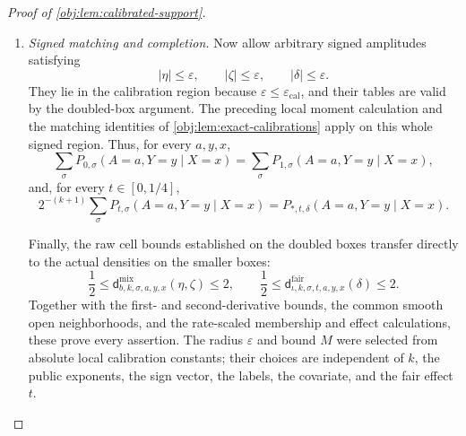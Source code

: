 \documentclass[11pt]{article}
\begin{document}
\begin{proof}[Proof of \cref{obj:lem:calibrated-support}]
\begin{enumerate}
For the fair family,
\cref{obj:lem:exact-calibrations} gives
\[
E_{\mathbf s}\mathsf G\!\left(
 t,\mathfrak p(t,\delta,u)+\delta Z_u\right)
=\mathsf G\!\left(\mathsf T(t,\delta),
                       \mathfrak p(t,\delta,u)\right).
\]
The control-risk average is \(\mathfrak p(t,\delta,u)\), by
\(E_{\mathbf s}Z_u=0\). Since treatment is fair, the four averaged cells are therefore
\[
\begin{aligned}
E_{\mathbf s}\pi^{\mathrm{fair}}_{\mathrm r,\mathbf s,01}
&=\frac12\mathfrak p(t,\delta,u),&
E_{\mathbf s}\pi^{\mathrm{fair}}_{\mathrm r,\mathbf s,00}
&=\frac12\{1-\mathfrak p(t,\delta,u)\},\\
E_{\mathbf s}\pi^{\mathrm{fair}}_{\mathrm r,\mathbf s,11}
&=\frac12\mathsf G(\mathsf T(t,\delta),\mathfrak p(t,\delta,u)),&
E_{\mathbf s}\pi^{\mathrm{fair}}_{\mathrm r,\mathbf s,10}
&=\frac12\{1-\mathsf G(\mathsf T(t,\delta),\mathfrak p(t,\delta,u))\}.
\end{aligned}
\]
These are exactly the comparator cells. Counting sign extensions and using validity proves the required full uniform-average identity. The calibration identities invoked here apply also at \(t=0\), at zero amplitudes, and at \(u=0,1\).

\item \textit{Signed matching and completion.}
Now allow arbitrary signed amplitudes satisfying
\[
|\eta|\le\varepsilon,\qquad
|\zeta|\le\varepsilon,\qquad
|\delta|\le\varepsilon.
\]
They lie in the calibration region because
\(\varepsilon\le\varepsilon_{\mathrm{cal}}\), and their tables are valid by the doubled-box argument. The preceding local moment calculation and the matching identities of
\cref{obj:lem:exact-calibrations} apply on this whole signed region. Thus, for every \(a,y,x\),
\[
\sum_\sigma P_{0,\sigma}(A=a,Y=y\mid X=x)
=\sum_\sigma P_{1,\sigma}(A=a,Y=y\mid X=x),
\]
and, for every \(t\in[0,1/4]\),
\[
2^{-(k+1)}
\sum_\sigma P_{t,\sigma}(A=a,Y=y\mid X=x)
=P_{*,t,\delta}(A=a,Y=y\mid X=x).
\]

Finally, the raw cell bounds established on the doubled boxes transfer directly to the actual densities on the smaller boxes:
\[
\frac12\le
\mathsf d^{\mathrm{mix}}_{b,k,\sigma,a,y,x}(\eta,\zeta)
\le2,
\qquad
\frac12\le
\mathsf d^{\mathrm{fair}}_{\iota,k,\sigma,t,a,y,x}(\delta)
\le2.
\]
Together with the first- and second-derivative bounds, the common smooth open neighborhoods, and the rate-scaled membership and effect calculations, these prove every assertion. The radius \(\varepsilon\) and bound \(M\) were selected from absolute local calibration constants; their choices are independent of \(k\), the public exponents, the sign vector, the labels, the covariate, and the fair effect \(t\).
\end{enumerate}
\end{proof}
\end{document}
